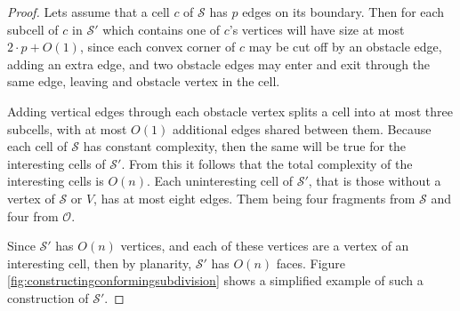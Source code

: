 \begin{proof}
Lets assume that a cell $c$ of $\mathcal{S}$ has $p$ edges on its boundary. Then for each 
subcell of $c$ in $\mathcal{S}'$ which contains one of $c$'s vertices will have size at most 
$2\cdot p + O(1)$, since each convex corner of $c$ may be cut off by an obstacle edge, adding 
an extra edge, and two obstacle edges may enter and exit through the same edge, leaving and 
obstacle vertex in the cell.

Adding vertical edges through each obstacle vertex splits a cell into at most three subcells, 
with at most $O(1)$ additional edges shared between them. Because each cell of $\mathcal{S}$ 
has constant complexity, then the same will be true for the interesting cells of 
$\mathcal{S}'$. From this it follows that the total complexity of the interesting cells is 
$O(n)$. Each uninteresting cell of $\mathcal{S}'$, that is those without a vertex of 
$\mathcal{S}$ or $V$, has at most eight edges. Them being four fragments from 
$\mathcal{S}$ and four from $\mathcal{O}$.

Since $\mathcal{S}'$ has $O(n)$ vertices, and each of these vertices are a vertex of an 
interesting cell, then by planarity, $\mathcal{S}'$ has $O(n)$ faces. Figure 
\ref{fig:constructingconformingsubdivision} shows a simplified example of such a construction 
of $\mathcal{S}'$. 


\end{proof}
